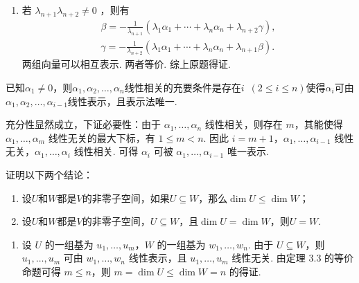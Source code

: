 \begin{exercise}
\begin{exgroup}
\begin{answer}
\begin{enumerate}
                \item 若 $\lambda_{n+1}\lambda_{n+2}\neq 0$ ，则有
                      \begin{gather*}
                          \beta=-\frac 1{\lambda_{n+1}}(\lambda_1\alpha_1+\cdots+\lambda_n\alpha_n+\lambda_{n+2}\gamma), \\
                          \gamma=-\frac 1{\lambda_{n+2}}(\lambda_1\alpha_1+\cdots+\lambda_n\alpha_n+\lambda_{n+1}\beta).
                      \end{gather*}
                    两组向量可以相互表示. 两者等价. 综上原题得证.
            \end{enumerate}
        \end{answer}
    \end{exgroup}

    \begin{exgroup}
        \item 已知$\alpha_1\neq 0$，则$\alpha_1,\alpha_2,\ldots,\alpha_n$线性相关的充要条件是存在$i\enspace(2 \leqslant i \leqslant n)$使得$\alpha_i$可由$\alpha_1,\alpha_2,\ldots,\alpha_{i-1}$线性表示，且表示法唯一.
        \begin{answer}
            充分性显然成立，下证必要性：由于 $\alpha_1,\ldots,\alpha_n$ 线性相关，则存在 $m$，其能使得 $\alpha_1,\ldots,\alpha_m$ 线性无关的最大下标，有 $1\leqslant m<n$. 因此 $i=m+1$，$\alpha_1,\ldots,\alpha_{i-1}$ 线性无关，$\alpha_1,\ldots,\alpha_i$ 线性相关. 可得 $\alpha_i$ 可被 $\alpha_1,\ldots,\alpha_{i-1}$ 唯一表示.
        \end{answer}

        \item 证明以下两个结论：
        \begin{enumerate}
            \item 设$U$和$W$都是$V$的非零子空间，如果$U\subseteq W$，那么$\dim U \leqslant \dim W$；

            \item 设$U$和$W$都是$V$的非零子空间，$U\subseteq W$，且$\dim U = \dim W$，则$U = W$.
        \end{enumerate}
        \begin{answer}
            \begin{enumerate}
                \item 设 $U$ 的一组基为 $u_1,\ldots,u_m$，$W$ 的一组基为 $w_1,\ldots,w_n$. 由于 $U\subseteq W$，则 $u_1,\ldots,u_m$ 可由 $w_1,\ldots,w_n$ 线性表示，且 $u_1,\ldots,u_m$ 线性无关. 由定理 3.3 的等价命题可得 $m\leqslant n$，则 $m=\dim U\leqslant\dim W=n$ 的得证.


\end{enumerate}
\end{answer}
\end{exgroup}
\end{exercise}

